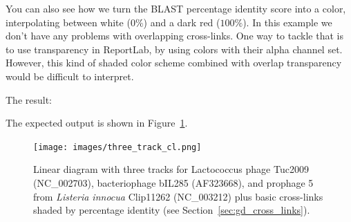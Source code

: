 You can also see how we turn the BLAST percentage identity score into a color,
interpolating between white ($0\%$) and a dark red ($100\%$). In this example
we don't have any problems with overlapping cross-links. One way to tackle that
is to use transparency in ReportLab, by using colors with their alpha channel set.
However, this kind of shaded color scheme combined with overlap transparency
would be difficult to interpret.
\begin{htmlonly}
\noindent The result:


\end{htmlonly}
\begin{latexonly}
\noindent The expected output is shown in Figure~\ref{fig:three_track_cl}.
\begin{figure}[htbp]
\centering
\texttt{[image: images/three\_track\_cl.png]}
\caption{Linear diagram with three tracks for Lactococcus phage Tuc2009
(NC\_002703), bacteriophage bIL285 (AF323668), and prophage 5 from
\textit{Listeria innocua} Clip11262 (NC\_003212) plus basic cross-links
shaded by percentage identity (see Section~\ref{sec:gd_cross_links}).}
\label{fig:three_track_cl}
\end{figure}
\end{latexonly}

